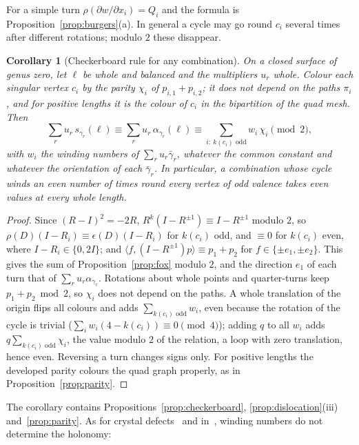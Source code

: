 \documentclass[11pt,a4paper]{article}
\newtheorem{corollary}{Corollary}
\newcommand{\shift}{s}
\begin{document}
For a simple turn $\rho(\partial w/\partial x_i) = Q_i$ and the formula is
Proposition~\ref{prop:burgers}(a). In general a cycle may go round $c_i$
several times after different rotations; modulo $2$ these disappear.

\begin{corollary}[Checkerboard rule for any combination]\label{cor:checker}
On a closed surface of genus zero, let $\ell$ be whole and balanced and the
multipliers $u_r$ whole. Colour each singular vertex $c_i$ by the parity
$\chi_i$ of $p_{i,1} + p_{i,2}$; it does not depend on the paths $\pi_i$, and
for positive lengths it is the colour of $c_i$ in the bipartition of the quad
mesh. Then
\[
  \sum_r u_r\, \shift_{\gamma_r}(\ell) \equiv \sum_r u_r\, \alpha_{\gamma_r}(\ell)
  \equiv \sum_{i:\ k(c_i) \text{ odd}} w_i\, \chi_i \pmod 2 ,
\]
with $w_i$ the winding numbers of $\sum_r u_r \bar\gamma_r$, whatever the
common constant and whatever the orientation of each $\bar\gamma_r$. In
particular, a combination whose cycle winds an even number of times round every
vertex of odd valence takes even values at every whole length.
\end{corollary}

\begin{proof}
Since $(R - I)^2 = -2R$, $R^k(I - R^{\pm1}) \equiv I - R^{\pm1}$ modulo $2$, so
$\rho(D)(I - R_i) \equiv \epsilon(D)(I - R_i)$ for $k(c_i)$ odd, and $\equiv 0$
for $k(c_i)$ even, where $I - R_i \in \{0, 2I\}$; and $\langle f, (I -
R^{\pm1})p\rangle \equiv p_1 + p_2$ for $f \in \{\pm e_1, \pm e_2\}$. This
gives the sum of Proposition~\ref{prop:fox} modulo $2$, and the direction
$e_1$ of each turn that of $\sum_r u_r \alpha_{\gamma_r}$. Rotations about
whole points and quarter-turns keep $p_1 + p_2 \bmod 2$, so $\chi_i$ does not
depend on the paths. A whole translation of the origin flips all colours and
adds $\sum_{k(c_i)\text{ odd}} w_i$, even because the rotation of the cycle is
trivial ($\sum_i w_i (4 - k(c_i)) \equiv 0 \pmod 4$); adding $q$ to all $w_i$
adds $q \sum_{k(c_i)\text{ odd}} \chi_i$, the value modulo $2$ of the
relation, a loop with zero translation, hence even. Reversing a turn changes
signs only. For positive lengths the developed parity colours the quad graph
properly, as in Proposition~\ref{prop:parity}.
\end{proof}

The corollary contains Propositions~\ref{prop:checkerboard},
\ref{prop:dislocation}(iii) and~\ref{prop:parity}. As for crystal
defects~\cite{kleman2008disclinations} and in~\cite[\S7]{izmestiev2013torus},
winding numbers do not determine the holonomy:
\end{document}
